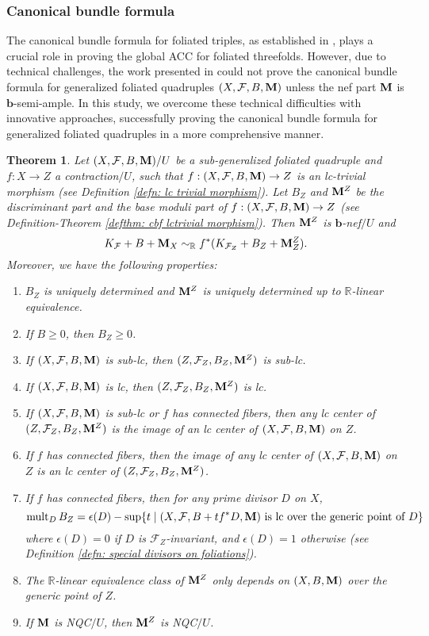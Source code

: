 \documentclass[11pt]{amsart}
\numberwithin{equation}{section}
\newcommand{\bb}{\bm{b}}
\newcommand{\Mm}{{\bf{M}}}
\newcommand{\Rr}{\mathbb{R}}
\newcommand{\mult}{\operatorname{mult}}
\newcommand{\Ff}{\mathcal{F}}
\newtheorem{thm}{Theorem}[subsection]
\theoremstyle{definition}
\theoremstyle{definition}
\theoremstyle{definition}
\begin{document}
\subsubsection{Canonical bundle formula} The canonical bundle formula for foliated triples, as established in \cite[Theorem 1.3]{LLM23}, plays a crucial role in proving the global ACC for foliated threefolds. However, due to technical challenges, the work presented in \cite{LLM23} could not prove the canonical bundle formula for generalized foliated quadruples $(X,\Ff,B,\Mm)$ unless the nef part $\Mm$ is $\bb$-semi-ample. In this study, we overcome these technical difficulties with innovative approaches, successfully proving the canonical bundle formula for generalized foliated quadruples in a more comprehensive manner.

\begin{thm}\label{thm: cbf gfq}
Let $(X,\Ff,B,\Mm)/U$ be a sub-generalized foliated quadruple and $f: X\rightarrow Z$ a contraction$/U$, such that $f: (X,\Ff,B,\Mm)\rightarrow Z$ is an lc-trivial morphism (see Definition \ref{defn: lc trivial morphism}). Let $B_Z$ and $\Mm^Z$ be the discriminant part and the base moduli part of $f: (X,\Ff,B,\Mm)\rightarrow Z$ (see Definition-Theorem \ref{defthm: cbf lctrivial morphism}). Then $\Mm^Z$ is $\bb$-nef$/U$ and
$$K_{\Ff}+B+\Mm_X\sim_{\mathbb R}f^*(K_{\Ff_Z}+B_Z+\Mm^Z_Z).$$
Moreover, we have the following properties:
\begin{enumerate}
\item $B_Z$ is uniquely determined and $\Mm^Z$ is uniquely determined up to $\Rr$-linear equivalence.
\item If $B\geq 0$, then $B_Z\geq 0$.
\item If $(X,\Ff,B,\Mm)$ is sub-lc, then $(Z,\Ff_Z,B_Z,\Mm^Z)$ is sub-lc.
\item If $(X,\Ff,B,\Mm)$ is lc, then $(Z,\Ff_Z,B_Z,\Mm^Z)$ is lc.
\item If $(X,\Ff,B,\Mm)$ is sub-lc or $f$ has connected fibers, then any lc center of $(Z,\Ff_Z,B_Z,\Mm^Z)$ is the image of an lc center of $(X,\Ff,B,\Mm)$ on $Z$.
\item If $f$ has connected fibers, then the image of any lc center of $(X,\Ff,B,\Mm)$ on $Z$ is an lc center of $(Z,\Ff_Z,B_Z,\Mm^Z)$.
\item If $f$ has connected fibers, then for any prime divisor $D$ on $X$, 
$$\mult_DB_Z=\epsilon(D)-\sup\{t\mid (X,\Ff,B+tf^*D,\Mm)\text{ is lc over the generic point of }D\}$$
where $\epsilon(D)=0$ if $D$ is $\Ff_Z$-invariant, and $\epsilon(D)=1$ otherwise (see Definition \ref{defn: special divisors on foliations}). 
\item The $\Rr$-linear equivalence class of $\Mm^Z$ only depends on $(X,B,\Mm)$ over the generic point of $Z$.
\item If $\Mm$ is NQC$/U$, then $\Mm^Z$ is NQC$/U$.
\end{enumerate}
\end{thm}
\end{document}
